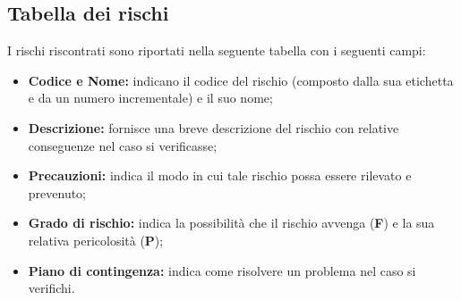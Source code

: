 \subsection{Tabella dei rischi}
I rischi riscontrati sono riportati nella seguente tabella con i seguenti campi:
\begin{itemize}
\item \textbf{Codice e Nome:} indicano il codice del rischio (composto dalla sua etichetta e da un numero incrementale) e il suo nome;
\item \textbf{Descrizione:} fornisce una breve descrizione del rischio con relative conseguenze nel caso si verificasse;
\item \textbf{Precauzioni:} indica il modo in cui tale rischio possa essere rilevato e prevenuto;
\item \textbf{Grado di rischio:} indica la possibilità che il rischio avvenga (\textbf{F}) e la sua relativa pericolosità (\textbf{P});
\item \textbf{Piano di contingenza:} indica come risolvere un problema nel caso si verifichi.
\end{itemize}

